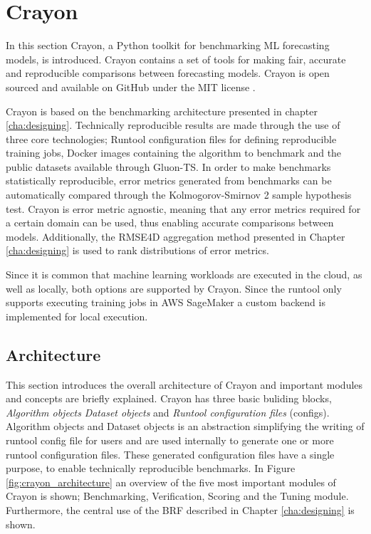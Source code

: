 \chapter{Crayon}
\label{cha:crayon}

In this section Crayon, a Python toolkit for benchmarking ML forecasting models, is introduced. Crayon contains a set of tools for making fair, accurate and reproducible comparisons between forecasting models. Crayon is open sourced and available on GitHub under the MIT license \cite{crayon_github}.

Crayon is based on the benchmarking architecture presented in chapter \ref{cha:designing}. Technically reproducible results are made through the use of three core technologies; Runtool configuration files for defining reproducible training jobs, Docker images containing the algorithm to benchmark and the public datasets available through Gluon-TS. In order to make benchmarks statistically reproducible, error metrics generated from benchmarks can be automatically compared through the Kolmogorov-Smirnov 2 sample hypothesis test. Crayon is error metric agnostic, meaning that any error metrics required for a certain domain can be used, thus enabling accurate comparisons between models. Additionally, the RMSE4D aggregation method presented in Chapter \ref{cha:designing} is used to rank distributions of error metrics.

Since it is common that machine learning workloads are executed in the cloud, as well as locally, both options are supported by Crayon. Since the runtool only supports executing training jobs in AWS SageMaker a custom backend is implemented for local execution.

\section{Architecture}

This section introduces the overall architecture of Crayon and important modules and concepts are briefly explained.
Crayon has three basic buliding blocks, \textit{Algorithm objects} \textit{Dataset objects} and \textit{Runtool configuration files} (configs). Algorithm objects and Dataset objects is an abstraction simplifying the writing of runtool config file for users and are used internally to generate one or more runtool configuration files. These generated configuration files have a single purpose, to enable technically reproducible benchmarks. In Figure \ref{fig:crayon_architecture} an overview of the five most important modules of Crayon is shown; Benchmarking, Verification, Scoring and the Tuning module. Furthermore, the central use of the BRF described in Chapter \ref{cha:designing} is shown.

